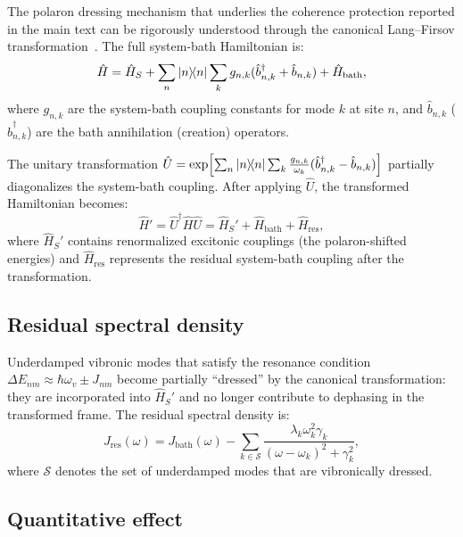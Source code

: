 \documentclass[11pt,a4paper]{article}
\begin{document}
The polaron dressing mechanism that underlies the coherence protection reported in the main text can be rigorously understood through the canonical Lang--Firsov transformation~\cite{Chin2013,Huelga2013}. The full system-bath Hamiltonian is:
\begin{equation}\label{eq:SI_full_hamiltonian}
\hat{H} = \hat{H}_S + \sum_n \dyad{n} \sum_k g_{n,k}(\hat{b}_{n,k}^\dagger + \hat{b}_{n,k}) + \hat{H}_{\mathrm{bath}},
\end{equation}
where $g_{n,k}$ are the system-bath coupling constants for mode $k$ at site $n$, and $\hat{b}_{n,k}$ ($\hat{b}_{n,k}^\dagger$) are the bath annihilation (creation) operators.

The unitary transformation $\hat{U} = \exp\!\left[\sum_n \dyad{n} \sum_k \frac{g_{n,k}}{\omega_k}(\hat{b}_{n,k}^\dagger - \hat{b}_{n,k})\right]$ partially diagonalizes the system-bath coupling.
After applying $\hat{U}$, the transformed Hamiltonian becomes:
\begin{equation}\label{eq:SI_lf_hamiltonian}
\hat{H}' = \hat{U}^\dagger \hat{H} \hat{U} = \hat{H}_S' + \hat{H}_{\mathrm{bath}} + \hat{H}_{\mathrm{res}},
\end{equation}
where $\hat{H}_S'$ contains renormalized excitonic couplings (the polaron-shifted energies) and $\hat{H}_{\mathrm{res}}$ represents the residual system-bath coupling after the transformation.

\subsection{Residual spectral density}

Underdamped vibronic modes that satisfy the resonance condition $\Delta E_{nm} \approx \hbar\omega_v \pm J_{nm}$ become partially ``dressed'' by the canonical transformation: they are incorporated into $\hat{H}_S'$ and no longer contribute to dephasing in the transformed frame. The residual spectral density is:
\begin{equation}\label{eq:SI_residual_spectral}
J_{\mathrm{res}}(\omega) = J_{\mathrm{bath}}(\omega) - \sum_{k \in \mathcal{S}} \frac{\lambda_k \omega_k^2 \gamma_k}{(\omega - \omega_k)^2 + \gamma_k^2},
\end{equation}
where $\mathcal{S}$ denotes the set of underdamped modes that are vibronically dressed.

\subsection{Quantitative effect}
\end{document}
